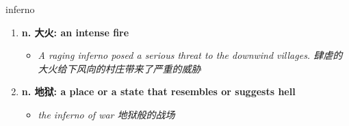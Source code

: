 
\begin{frame}
{\huge inferno}
\begin{center}
\begin{enumerate}\Large
  \item \textbf{n. 大火: an intense fire}
  \begin{itemize}
    \item \em{\Large{A raging inferno posed a serious threat to the downwind villages. 肆虐的大火给下风向的村庄带来了严重的威胁}}
  \end{itemize}
  \item \textbf{n. 地狱: a place or a state that resembles or suggests hell}
  \begin{itemize}
    \item \em{\Large{the inferno of war 地狱般的战场}}
  \end{itemize}
\end{enumerate}
\end{center}
\end{frame}
